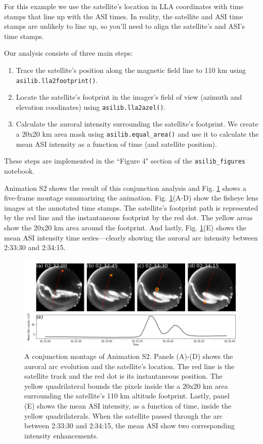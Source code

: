 \documentclass[utf8]{FrontiersinHarvard} %
\begin{document}
For this example we use the satellite's location in LLA coordinates with time stamps that line up with the ASI times. In reality, the satellite and ASI time stamps are unlikely to line up, so you'll need to align the satellite's and ASI's time stamps.

Our analysis consists of three main steps:
\begin{enumerate}
    \item Trace the satellite's position along the magnetic field line to 110 km using  \verb|asilib.lla2footprint()|.
    \item Locate the satellite's footprint in the imager's field of view (azimuth and elevation coodinates) using \verb|asilib.lla2azel()|.
    \item Calculate the auroral intensity surrounding the satellite's footprint. We create a 20x20 km area mask using \verb|asilib.equal_area()| and use it to calculate the mean ASI intensity as a function of time (and satellite position).
\end{enumerate} These steps are implemented in the ``Figure 4" section of the \verb|asilib_figures| notebook.

Animation S2 shows the result of this conjunction analysis and Fig. \ref{fig4} shows a five-frame montage summarizing the animation. Fig. \ref{fig4}(A-D) show the fisheye lens images at the annotated time stamps. The satellite's footprint path is represented by the red line and the instantaneous footprint by the red dot. The yellow areas show the 20x20 km area around the footprint. And lastly, Fig. \ref{fig4}(E) shows the mean ASI intensity time series---clearly showing the auroral arc intensity between 2:33:30 and 2:34:15.

\begin{figure}
      \includegraphics[width=\textwidth]{figures/fig4.png}
      \caption{A conjunction montage of Animation S2. Panels (A)-(D) shows the auroral arc evolution and the satellite's location. The red line is the satellite track and the red dot is its instantaneous position. The yellow quadrilateral bounds the pixels inside the a 20x20 km area surrounding the satellite's 110 km altitude footprint. Lastly, panel (E) shows the mean ASI intensity, as a function of time, inside the yellow quadrilaterals. When the satellite passed through the arc between 2:33:30 and 2:34:15, the mean ASI show two corresponding intensity enhancements.}
      \label{fig4}
\end{figure}
\end{document}
